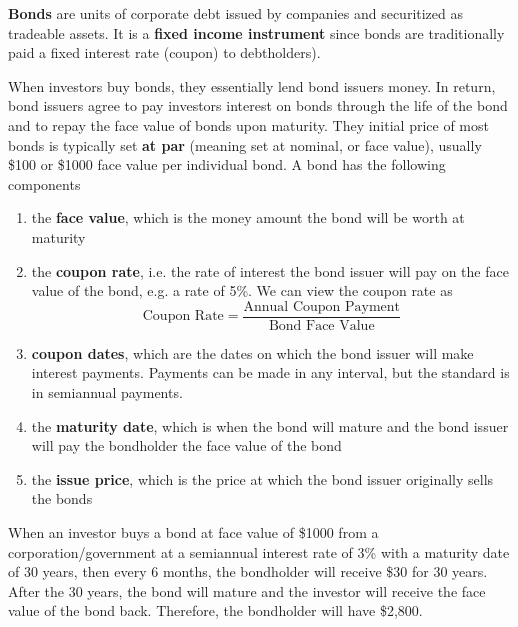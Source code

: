 \documentclass{article}
\begin{document}
    \begin{definition}[Bond]
      \label{def:bond}
      \textbf{Bonds} are units of corporate debt issued by companies and securitized as tradeable assets. It is a \textbf{fixed income instrument} since bonds are traditionally paid a fixed interest rate (coupon) to debtholders). 

      When investors buy bonds, they essentially lend bond issuers money. In return, bond issuers agree to pay investors interest on bonds through the life of the bond and to repay the face value of bonds upon maturity. They initial price of most bonds is typically set \textbf{at par} (meaning set at nominal, or face value), usually \$100 or \$1000 face value per individual bond. A bond has the following components
      \begin{enumerate}
        \item the \textbf{face value}, which is the money amount the bond will be worth at maturity
        \item the \textbf{coupon rate}, i.e. the rate of interest the bond issuer will pay on the face value of the bond, e.g. a rate of 5\%. We can view the coupon rate as 
        \begin{equation}
          \text{Coupon Rate} = \frac{\text{Annual Coupon Payment}}{\text{Bond Face Value}}
        \end{equation}
        \item \textbf{coupon dates}, which are the dates on which the bond issuer will make interest payments. Payments can be made in any interval, but the standard is in semiannual payments. 
        \item the \textbf{maturity date}, which is when the bond will mature and the bond issuer will pay the bondholder the face value of the bond 
        \item the \textbf{issue price}, which is the price at which the bond issuer originally sells the bonds
      \end{enumerate}
      When an investor buys a bond at face value of \$1000 from a corporation/government at a semiannual interest rate of 3\% with a maturity date of 30 years, then every 6 months, the bondholder will receive \$30 for 30 years. After the 30 years, the bond will mature and the investor will receive the face value of the bond back. Therefore, the bondholder will have \$2,800. 
    \end{definition}
\end{document}
